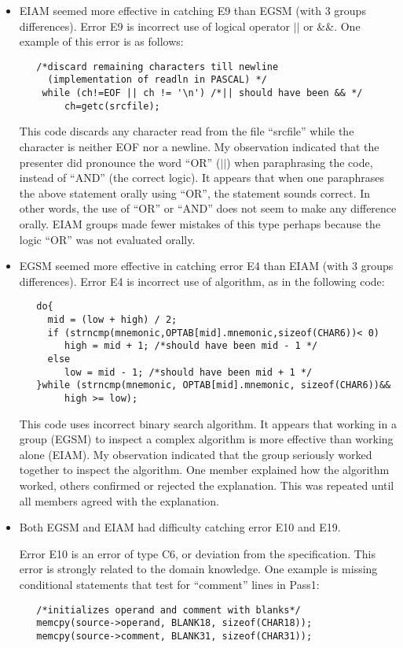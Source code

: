 \begin{itemize}

\item EIAM seemed  more effective in catching E9 than EGSM (with
3 groups differences). Error E9 is incorrect use of logical operator
$||$ or \&\&. 
One example of this error is as follows:
\small
\begin{verbatim}
   /*discard remaining characters till newline
     (implementation of readln in PASCAL) */ 
    while (ch!=EOF || ch != '\n') /*|| should have been && */
        ch=getc(srcfile);
\end{verbatim}
\normalsize
This code  discards any character read from the file ``srcfile'' while
the character is neither EOF nor a newline.
My observation indicated that the presenter did pronounce the word
``OR'' ($||$) when paraphrasing the code, instead of 
``AND'' (the correct logic). It appears that when one paraphrases the
above statement orally 
using ``OR'', the statement sounds correct. In other
words, the use of ``OR'' or ``AND'' does not seem to make
any difference orally.
EIAM groups made fewer mistakes of this type perhaps
because the logic ``OR'' was not evaluated orally.


\item EGSM seemed more effective in catching error E4 than EIAM (with 3
groups differences). Error E4 is incorrect use of algorithm, as in 
the following code:
\small
\begin{verbatim}
   do{
     mid = (low + high) / 2;
     if (strncmp(mnemonic,OPTAB[mid].mnemonic,sizeof(CHAR6))< 0)
        high = mid + 1; /*should have been mid - 1 */
     else
        low = mid - 1; /*should have been mid + 1 */
   }while (strncmp(mnemonic, OPTAB[mid].mnemonic, sizeof(CHAR6))&&
        high >= low);
\end{verbatim}
\normalsize

This code uses incorrect binary search algorithm. 
It appears that working in a group (EGSM) to inspect a complex
algorithm is more effective than working alone (EIAM).
My observation indicated
that the group seriously worked together to inspect the algorithm. One
member explained how the algorithm worked, others confirmed or
rejected the explanation. This was repeated until all members agreed
with the explanation. 

\item Both EGSM and EIAM had difficulty catching error E10 and E19. 

Error E10 is an error of type C6, or deviation from the
specification. This error is strongly related
to the domain knowledge. One example is missing conditional statements
that test for ``comment'' lines in  Pass1:
\begin{verbatim}
   /*initializes operand and comment with blanks*/
   memcpy(source->operand, BLANK18, sizeof(CHAR18)); 
   memcpy(source->comment, BLANK31, sizeof(CHAR31));


\end{verbatim}
\end{itemize}
